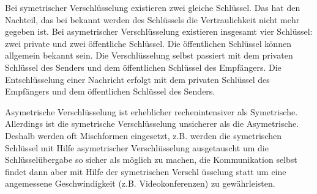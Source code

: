 \begin{answer}
Bei symetrischer Verschlüsselung existieren zwei gleiche Schlüssel. Das hat den Nachteil, das bei bekannt werden des Schlüssels die Vertraulichkeit nicht mehr gegeben ist.
Bei asymetrischer Verschlüsselung existieren insgesamt vier Schlüssel: zwei private und zwei öffentliche Schlüssel. Die öffentlichen Schlüssel können allgemein bekannt sein. Die Verschlüsselung selbst passiert mit dem privaten Schlüssel des Senders und dem öffentlichen Schlüssel des Empfängers.
Die Entschlüsselung einer Nachricht erfolgt mit dem privaten Schlüssel des Empfängers und dem
öffentlichen Schlüssel des Senders.

Asymetrische Verschlüsselung ist erheblicher rechenintensiver als Symetrische. Allerdings ist die
symetrische Verschlüsselung unsicherer als die Asymetrische. Deshalb werden oft Mischformen
eingesetzt, z.B. werden die symetrischen Schlüssel mit Hilfe asymetrischer Verschlüsselung ausgetauscht
um die Schlüsselübergabe so sicher als möglich zu machen, die Kommunikation selbst
findet dann aber mit Hilfe der symetrischen Verschl üsselung statt um eine angemessene Geschwindigkeit
(z.B. Videokonferenzen) zu gewährleisten.
\end{answer}